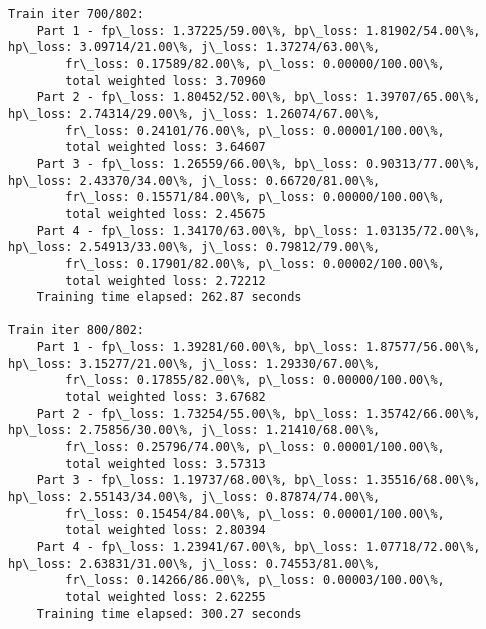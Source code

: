 \documentclass[11pt]{article}
\begin{document}
\begin{Verbatim}[commandchars=\\\{\}]
Train iter 700/802:
	Part 1 - fp\_loss: 1.37225/59.00\%, bp\_loss: 1.81902/54.00\%, hp\_loss: 3.09714/21.00\%, j\_loss: 1.37274/63.00\%, 
		fr\_loss: 0.17589/82.00\%, p\_loss: 0.00000/100.00\%, 
		total weighted loss: 3.70960
	Part 2 - fp\_loss: 1.80452/52.00\%, bp\_loss: 1.39707/65.00\%, hp\_loss: 2.74314/29.00\%, j\_loss: 1.26074/67.00\%, 
		fr\_loss: 0.24101/76.00\%, p\_loss: 0.00001/100.00\%, 
		total weighted loss: 3.64607
	Part 3 - fp\_loss: 1.26559/66.00\%, bp\_loss: 0.90313/77.00\%, hp\_loss: 2.43370/34.00\%, j\_loss: 0.66720/81.00\%, 
		fr\_loss: 0.15571/84.00\%, p\_loss: 0.00000/100.00\%, 
		total weighted loss: 2.45675
	Part 4 - fp\_loss: 1.34170/63.00\%, bp\_loss: 1.03135/72.00\%, hp\_loss: 2.54913/33.00\%, j\_loss: 0.79812/79.00\%, 
		fr\_loss: 0.17901/82.00\%, p\_loss: 0.00002/100.00\%, 
		total weighted loss: 2.72212
	Training time elapsed: 262.87 seconds

Train iter 800/802:
	Part 1 - fp\_loss: 1.39281/60.00\%, bp\_loss: 1.87577/56.00\%, hp\_loss: 3.15277/21.00\%, j\_loss: 1.29330/67.00\%, 
		fr\_loss: 0.17855/82.00\%, p\_loss: 0.00000/100.00\%, 
		total weighted loss: 3.67682
	Part 2 - fp\_loss: 1.73254/55.00\%, bp\_loss: 1.35742/66.00\%, hp\_loss: 2.75856/30.00\%, j\_loss: 1.21410/68.00\%, 
		fr\_loss: 0.25796/74.00\%, p\_loss: 0.00001/100.00\%, 
		total weighted loss: 3.57313
	Part 3 - fp\_loss: 1.19737/68.00\%, bp\_loss: 1.35516/68.00\%, hp\_loss: 2.55143/34.00\%, j\_loss: 0.87874/74.00\%, 
		fr\_loss: 0.15454/84.00\%, p\_loss: 0.00001/100.00\%, 
		total weighted loss: 2.80394
	Part 4 - fp\_loss: 1.23941/67.00\%, bp\_loss: 1.07718/72.00\%, hp\_loss: 2.63831/31.00\%, j\_loss: 0.74553/81.00\%, 
		fr\_loss: 0.14266/86.00\%, p\_loss: 0.00003/100.00\%, 
		total weighted loss: 2.62255
	Training time elapsed: 300.27 seconds


\end{Verbatim}
\end{document}
